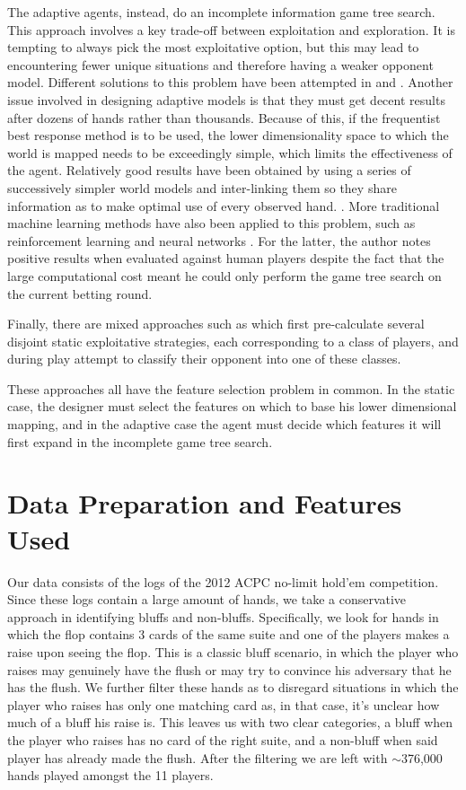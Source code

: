\documentclass[letterpaper]{article}
\begin{document}
The adaptive agents, instead, do an incomplete information game tree search. This approach involves a key trade-off between exploitation and exploration. It is tempting to always pick the most exploitative option, but this may lead to encountering fewer unique situations and therefore having a weaker opponent model. Different solutions to this problem have been attempted in  \cite{P6} and  \cite{P7}. Another issue involved in designing adaptive models is that they must get decent results after dozens of hands rather than thousands. Because of this, if the frequentist best response method is to be used, the lower dimensionality space to which the world is mapped needs to be exceedingly simple, which limits the effectiveness of the agent. Relatively good results have been obtained by using a series of successively simpler world models and inter-linking them so they share information as to make optimal use of every observed hand.  \cite{P6,P8}. More traditional machine learning methods have also been applied to this problem, such as reinforcement learning \cite{P13} and neural networks \cite{P9}. For the latter, the author notes positive results when evaluated against human players despite the fact that the large computational cost meant he could only perform the game tree search on the current betting round.

Finally, there are mixed approaches such as  \cite{P10} which first pre-calculate several disjoint static exploitative strategies, each corresponding to a class of players, and during play attempt to classify their opponent into one of these classes.

These approaches all have the feature selection problem in common. In the static case, the designer must select the features on which to base his lower dimensional mapping, and in the adaptive case the agent must decide which features it will first expand in the incomplete game tree search.

\section{
\fontsize{12pt}{15pt} 
\selectfont
Data Preparation and Features Used}
\fontsize{10pt}{12pt} 
\selectfont
Our data consists of the logs of the 2012 ACPC no-limit hold'em competition. Since these logs contain a large amount of hands, we take a conservative approach in identifying bluffs and non-bluffs. Specifically, we look for hands in which the flop contains 3 cards of the same suite and one of the players makes a raise upon seeing the flop. This is a classic bluff scenario, in which the player who raises may genuinely have the flush or may try to convince his adversary that he has the flush. We further filter these hands as to disregard situations in which the player who raises has only one matching card as, in that case, it's unclear how much of a bluff his raise is. This leaves us with two clear categories, a bluff when the player who raises has no card of the right suite, and a non-bluff when said player has already made the flush. After the filtering we are left with $\sim$376,000 hands played amongst the 11 players.
\end{document}
